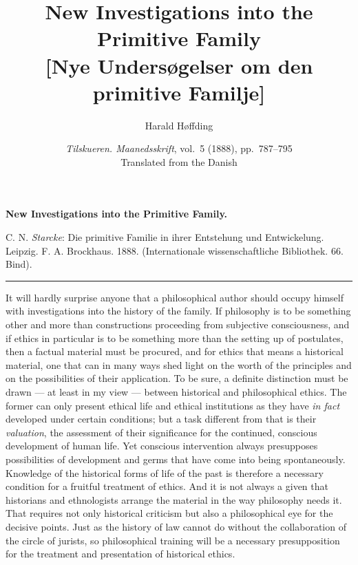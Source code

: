 \documentclass[12pt,a4paper,openany]{book}
\title{\textbf{New Investigations into the Primitive Family}\\[8pt]
  \large [Nye Undersøgelser om den primitive Familje]}
\author{Harald Høffding}
\date{\textit{Tilskueren. Maanedsskrift}, vol.~5 (1888), pp.~787--795\\[10pt]
  \small Translated from the Danish}
\newcommand{\opage}[1]{\marginnote{\footnotesize\textit{[#1]}}}
\begin{document}
\maketitle
\thispagestyle{empty}
\clearpage

\opage{787}\begin{center}\textbf{\large New Investigations into the Primitive Family.}\end{center}

\begin{center}\small C. N. \emph{Starcke}: Die primitive Familie in ihrer Entstehung und Entwickelung. Leipzig. F. A. Brockhaus. 1888. (Internationale wissenschaftliche Bibliothek. 66. Bind).\end{center}

\begin{center}\rule{1.3cm}{0.4pt}\end{center}

It will hardly surprise anyone that a philosophical author should
occupy himself with investigations into the history of the family. If philosophy
is to be something other and more than constructions proceeding from subjective
consciousness, and if ethics in particular is to be something more than
the setting up of postulates, then a factual material must be procured, and for
ethics that means a historical material, one that
can in many ways shed light on the worth of the principles and on the possibilities
of their application. To be sure, a definite distinction must be drawn --- at least
in my view --- between historical and philosophical
ethics. The former can only present ethical life and ethical
institutions as they have \emph{in fact} developed under certain conditions;
but a task different from that is their \emph{valuation},
the assessment of their significance for the continued, conscious development
of human life. Yet conscious intervention
always presupposes possibilities of development and germs that have come into being
spontaneously. Knowledge of the historical forms of life of the past is
therefore a necessary condition for a fruitful treatment of
ethics. And it is not always a given that historians and ethnologists
arrange the material in the way philosophy needs it. That
requires not only historical criticism but also a philosophical eye for the
decisive points. Just as the history of law cannot do without
the collaboration of the circle of jurists, so philosophical training will
be a necessary presupposition for the treatment and presentation
of historical ethics.
\end{document}
